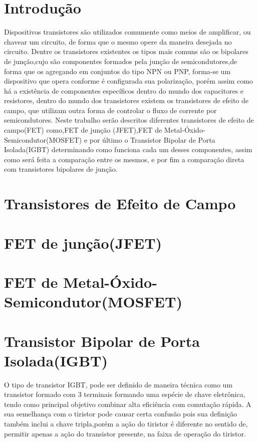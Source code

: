 \documentclass[12pt]{article}
\begin{document}
\section{Introdução}
    Dispositivos transistores são utilizados comumente como meios de amplificar, ou chavear um circuito, de forma que o mesmo opere da maneira desejada no circuito. Dentre os transistores existentes os tipos mais comuns são os bipolares de junção,cujo são componentes formados pela junção de semicondutores,de forma que os agregando em conjuntos do tipo NPN ou PNP, forma-se um dispositivo que opera conforme é configurada sua polarização, porém assim como há a existência de componentes específicos dentro do mundo dos capacitores e resistores, dentro do mundo dos transistores existem os transistores de efeito de campo, que utilizam outra forma de controlar o fluxo de corrente por semicondutores. Neste trabalho serão descritos diferentes transistores de efeito de campo(FET) como,FET de junção (JFET),FET de Metal-Óxido-Semicondutor(MOSFET) e por último o Transistor Bipolar de Porta Isolada(IGBT) determinando como funciona cada um desses componentes, assim como será feita a comparação entre os mesmos, e por fim a comparação direta com transistores bipolares de junção.

\newpage
\section{Transistores de Efeito de Campo}
\section{FET de junção(JFET)}
\section{FET de Metal-Óxido-Semicondutor(MOSFET)}
\section{Transistor Bipolar de Porta Isolada(IGBT)}
O tipo de transistor IGBT, pode ser definido de maneira técnica como um transistor formado com 3 terminais formando uma espécie de chave eletrônica, tendo como principal objetivo combinar alta eficiência com comutação rápida. A sua semelhança com o tiristor pode causar certa confusão pois sua definição também inclui a chave tripla,porém a ação do tiristor é diferente no sentido de, permitir apenas a ação do transistor presente, na faixa de operação do tiristor.
\end{document}
